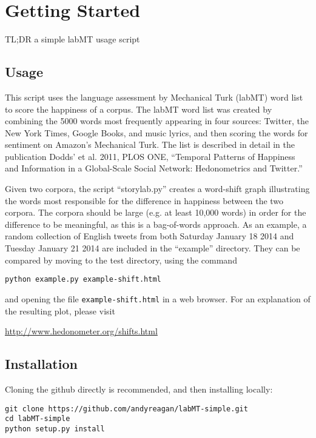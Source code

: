 \section{Getting Started}
\label{getting-started:welcome-to-labmt-simple-s-documentation}\label{getting-started:getting-started}\label{getting-started::doc}
TL;DR
a simple labMT usage script


\subsection{Usage}
\label{getting-started:usage}
This script uses the language assessment by Mechanical Turk (labMT) word list to score the happiness of a corpus. The labMT word list was created by combining the 5000 words most frequently appearing in four sources: Twitter, the New York Times, Google Books, and music lyrics, and then scoring the words for sentiment on Amazon's Mechanical Turk. The list is described in detail in the publication Dodds' et al. 2011, PLOS ONE, ``Temporal Patterns of Happiness and Information in a Global-Scale Social Network: Hedonometrics and Twitter.''

Given two corpora, the script ``storylab.py'' creates a word-shift graph illustrating the words most responsible for the difference in happiness between the two corpora. The corpora should be large (e.g. at least 10,000 words) in order for the difference to be meaningful, as this is a bag-of-words approach. As an example, a random collection of English tweets from both Saturday January 18 2014 and Tuesday January 21 2014 are included in the ``example'' directory. They can be compared by moving to the test directory, using the command
\begin{lstlisting}
python example.py example-shift.html
\end{lstlisting}

and opening the file \lstinline{example-shift.html} in a web browser. For an explanation of the resulting plot, please visit

\href{http://www.hedonometer.org/shifts.html}{http://www.hedonometer.org/shifts.html}


\subsection{Installation}
\label{getting-started:installation}
Cloning the github directly is recommended, and then installing locally:
\begin{lstlisting}
git clone https://github.com/andyreagan/labMT-simple.git
cd labMT-simple
python setup.py install
\end{lstlisting}

